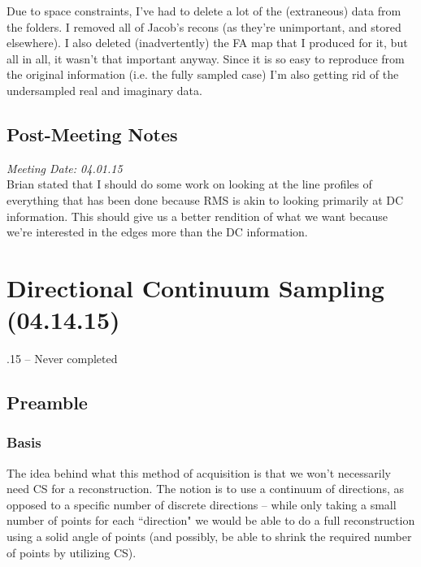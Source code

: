 \documentclass[11 pt]{article}
\let\oldsection\section
\renewcommand\section{\clearpage\newpage\oldsection}
\begin{document}
    Due to space constraints, I've had to delete a lot of the (extraneous) data from the folders. I removed all of Jacob's recons (as they're unimportant, and stored elsewhere). I also deleted (inadvertently) the FA map that I produced for it, but all in all, it wasn't that important anyway. Since it is so easy to reproduce from the original information (i.e. the fully sampled case) I'm also getting rid of the undersampled real and imaginary data. 
  
  \subsection{Post-Meeting Notes}
  
    \emph{Meeting Date: 04.01.15}\\
    Brian stated that I should do some work on looking at the line profiles of everything that has been done because RMS is akin to looking primarily at DC information. This should give us a better rendition of what we want because we're interested in the edges more than the DC information. 



\section{Directional Continuum Sampling (04.14.15)}
  
  .15 -- Never completed
  \subsection{Preamble}
    
    \subsubsection{Basis}

      The idea behind what this method of acquisition is that we won't necessarily need CS for a reconstruction. The notion is to use a continuum of directions, as opposed to a specific number of discrete directions --  while only taking a small number of points for each ``direction" we would be able to do a full reconstruction using a solid angle of points (and possibly, be able to shrink the required number of points by utilizing CS). 
    
\end{document}
